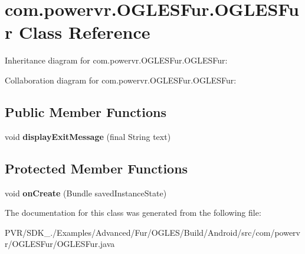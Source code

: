 \hypertarget{classcom_1_1powervr_1_1_o_g_l_e_s_fur_1_1_o_g_l_e_s_fur}{\section{com.\+powervr.\+O\+G\+L\+E\+S\+Fur.\+O\+G\+L\+E\+S\+Fur Class Reference}
\label{classcom_1_1powervr_1_1_o_g_l_e_s_fur_1_1_o_g_l_e_s_fur}
}


Inheritance diagram for com.\+powervr.\+O\+G\+L\+E\+S\+Fur.\+O\+G\+L\+E\+S\+Fur\+:


Collaboration diagram for com.\+powervr.\+O\+G\+L\+E\+S\+Fur.\+O\+G\+L\+E\+S\+Fur\+:
\subsection*{Public Member Functions}
\begin{DoxyCompactItemize}
\item 
\hypertarget{classcom_1_1powervr_1_1_o_g_l_e_s_fur_1_1_o_g_l_e_s_fur_ac1e7836c54bca29e59245cae4c49c393}{void {\bfseries display\+Exit\+Message} (final String text)}\label{classcom_1_1powervr_1_1_o_g_l_e_s_fur_1_1_o_g_l_e_s_fur_ac1e7836c54bca29e59245cae4c49c393}

\end{DoxyCompactItemize}
\subsection*{Protected Member Functions}
\begin{DoxyCompactItemize}
\item 
\hypertarget{classcom_1_1powervr_1_1_o_g_l_e_s_fur_1_1_o_g_l_e_s_fur_a990d549bd5e99329951bf17df4578293}{void {\bfseries on\+Create} (Bundle saved\+Instance\+State)}\label{classcom_1_1powervr_1_1_o_g_l_e_s_fur_1_1_o_g_l_e_s_fur_a990d549bd5e99329951bf17df4578293}

\end{DoxyCompactItemize}


The documentation for this class was generated from the following file\+:\begin{DoxyCompactItemize}
\item 
P\+V\+R/\+S\+D\+K\+\_./\+Examples/\+Advanced/\+Fur/\+O\+G\+L\+E\+S/\+Build/\+Android/src/com/powervr/\+O\+G\+L\+E\+S\+Fur/O\+G\+L\+E\+S\+Fur.\+java\end{DoxyCompactItemize}
